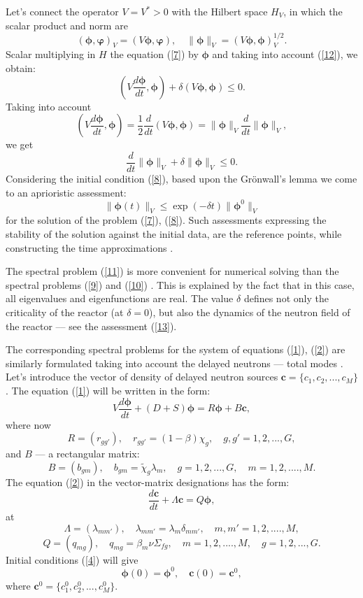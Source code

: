 \documentclass[authoryear]{elsarticle}
\begin{document}
Let’s connect the operator $V = V^* > 0$ with the Hilbert space $H_V$, in which the scalar product and norm are
\[
 (\bm \phi , \bm \varphi)_V =  (V \bm \phi , \bm \varphi),
 \quad  \|\bm \phi\|_V =  (V \bm \phi , \bm \phi)_V^{1/2} . 
\] 
Scalar multiplying in $H$ the equation (\ref{7}) by $\bm \phi$ and taking into account (\ref{12}), we obtain:
\[
 \left ( V \frac{d \bm \phi}{d t} , \bm \phi \right ) + \delta (V \bm \phi, \bm \phi ) \leq 0.
\] 
Taking into account
\[
 \left ( V \frac{d \bm \phi}{d t} , \bm \phi \right ) =
 \frac{1}{2} \frac{d}{d t} (V \bm \phi, \bm \phi) = 
 \|\bm \phi\|_V \frac{d }{d t}\|\bm \phi\|_V ,
\] 
we get
\[
 \frac{d }{d t} \|\bm \phi\|_V + \delta \|\bm \phi\|_V \leq 0 .
\] 
Considering the initial condition (\ref{8}), based upon the Grönwall's lemma we come to an aprioristic assessment:
\begin{equation}\label{13}
 \|\bm \phi(t)\|_V \leq \exp (-\delta t ) \|\bm \phi^0\|_V 
\end{equation} 
for the solution of the problem (\ref{7}), (\ref{8}). Such assessments expressing the stability of the solution against the initial data, are the reference points, while constructing the time approximations
\cite{Samarskiibook,SamarskiiMatusVabischevich2002}. 

The spectral problem (\ref{11}) is more convenient for numerical solving than the spectral problems (\ref{9}) and (\ref{10})
\cite{Golubbook,Saadbook}. This is explained by the fact that in this case, all eigenvalues and eigenfunctions are real. The value $\delta$ defines not only the criticality of the reactor (at $\delta = 0$), but also the dynamics of the neutron field of the reactor –-- see the assessment (\ref{13}).

The corresponding spectral problems for the system of equations (\ref{1}), (\ref{2}) are similarly formulated taking into account the delayed neutrons --- total modes \cite{verdu20103d}.
Let’s introduce the vector of density of delayed neutron sources $\bm c = \{c_1, c_2, ..., c_M\}$. The equation (\ref{1}) will be written in the form:
\begin{equation}\label{14}
 V \frac{d \bm \phi}{d t} + (D+S) \bm \phi = R \bm \phi +
 B \bm c,
\end{equation} 
where now
\[
 R = (r_{g g'}),
 \quad  r_{g g'} = (1-\beta) \chi_g ,
 \quad g, g' = 1,2, ..., G,
\] 
and $B$ --- a rectangular matrix:
\[
 B = (b_{gm}),
 \quad  b_{gm} = \widetilde{\chi}_g \lambda_m,
 \quad g = 1,2, ..., G,
 \quad m = 1,2, ....,M .  
\] 
The equation (\ref{2}) in the vector-matrix designations has the form:
\begin{equation}\label{15}
 \frac{d \bm c}{d t} + \Lambda \bm c = Q \bm \phi ,
\end{equation} 
at
\[
 \Lambda = (\lambda_{m m'}),
 \quad  \lambda_{m m'} = \lambda_m \delta_{m m'} ,
 \quad m, m' = 1,2, ....,M ,  
\] 
\[
 Q = (q_{mg}),
 \quad  q_{mg} = \beta_m \nu \Sigma_{fg},
 \quad m = 1,2, ....,M ,  
 \quad g = 1,2, ..., G .
\] 
Initial conditions (\ref{4}) will give
\begin{equation}\label{16}
 \bm \phi(0) = \bm \phi^0,
 \quad  \bm c(0) = \bm c^0,
\end{equation} 
where $\bm c^0 = \{ c_1^0,  c_2^0, ...,  c_M^0 \}$.
\end{document}
